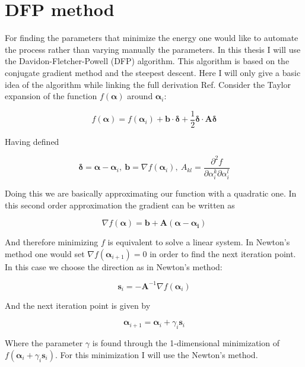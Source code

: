 \section{DFP method}
\label{DFP}

For finding the parameters that minimize the energy one would like to automate the process rather than varying manually the parameters.
In this thesis I will use the Davidon-Fletcher-Powell (DFP) algorithm\cite{larsevind,Fletcher2000}.
This algorithm is based on the conjugate gradient method and the steepest descent.
Here I will only give a basic idea of the algorithm while linking the full derivation Ref\cite{Fletcher2000}.
Consider the Taylor expansion of the function $f(\bm{\alpha})$ around $\bm{\alpha}_i$:

\begin{equation}
  f(\bm{\alpha})=f(\bm{\alpha}_i) + \bm{b}\cdot\bm{\delta} + \frac{1}{2}\bm{\delta}\cdot\bm{A\delta}
\end{equation}

Having defined

\begin{equation}
  \bm{\delta}=\bm{\alpha}-\bm{\alpha}_i,\>\bm{b}=\nabla f(\bm{\alpha}_i),\>A_{kl}=\dfrac{\partial^2f}{\partial\alpha_i^k\partial\alpha_i^l}
\end{equation}

Doing this we are basically approximating our function with a quadratic one.
In this second order approximation the gradient can be written as

\begin{equation}
  \nabla f(\bm{\alpha}) = \bm{b} + \bm{A(\alpha-\alpha_i)}
  \label{gradexp}
\end{equation}

And therefore minimizing $f$ is equivalent to solve a linear system.
In Newton's method one would set $\nabla f(\bm{\alpha}_{i+1})=0$ in order to find the next iteration point.
In this case we choose the direction as in Newton's method:

\begin{equation}
  \bm{s}_i=-\bm{A}^{-1}\nabla f(\bm{\alpha}_i)
\end{equation}

And the next iteration point is given by

\begin{equation}
  \bm{\alpha}_{i+1}=\bm{\alpha}_i+\gamma_i\bm{s}_i
\end{equation}

Where the parameter $\gamma$ is found through the 1-dimensional minimization of $f(\bm{\alpha}_i+\gamma_i\bm{s}_i)$.
For this minimization I will use the Newton's method.

